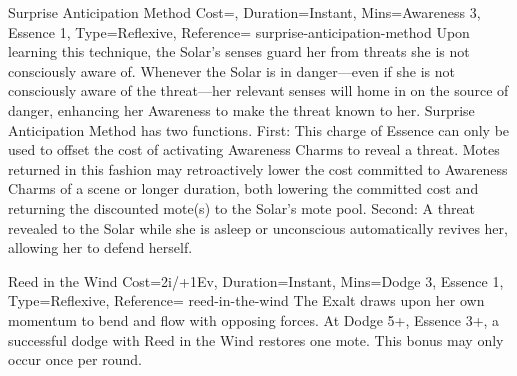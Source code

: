 \begin{Charm}{Surprise Anticipation Method}{
    Cost=\NoCost,
    Duration=Instant,
    Mins={Awareness 3, Essence 1},
    Type=Reflexive,
    Reference=\cite*[p.~267]{ex3}
}{surprise-anticipation-method}
    Upon learning this technique, the Solar’s senses guard her from threats she
    is not consciously aware of. Whenever the Solar is in danger—even if she is
    not consciously aware of the threat—her relevant senses will home in on the
    source of danger, enhancing her Awareness to make the threat known to her.
    Surprise Anticipation Method has two functions. First:  This charge of Essence can only be used to
    offset the cost of activating Awareness Charms to reveal a threat. Motes
    returned in this fashion may retroactively lower the cost committed to
    Awareness Charms of a scene or longer duration, both lowering the committed
    cost and returning the discounted mote(s) to the Solar’s mote pool. Second:
     A threat
    revealed to the Solar while she is asleep or unconscious automatically
    revives her, allowing her to defend herself.
\end{Charm}




\begin{Charm}{Reed in the Wind}{
    Cost=2i/+1Ev,
    Duration=Instant,
    Mins={Dodge 3, Essence 1},
    Type=Reflexive,
    Reference=\cite*[p.~299]{ex3}
}{reed-in-the-wind}
    The Exalt draws upon her own momentum to bend and flow with opposing
    forces.  At Dodge
    5+, Essence 3+, a successful dodge with Reed in the Wind restores one mote.
    This bonus may only occur once per round.
\end{Charm}





